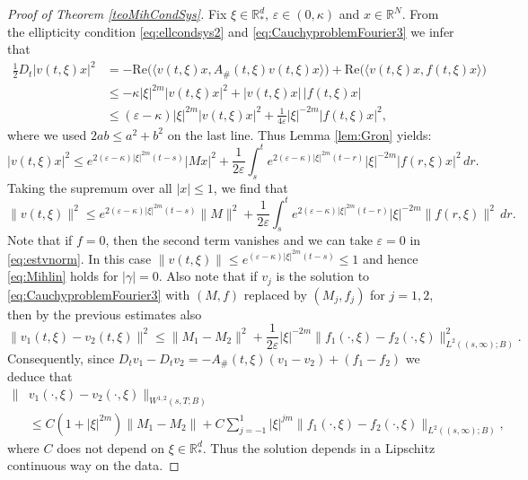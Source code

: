 \documentclass{amsart}
\theoremstyle{plain}
\theoremstyle{remark}
\theoremstyle{plain}
\numberwithin{equation}{section}
\begin{document}
\begin{proof}[Proof of Theorem \ref{teoMihCondSys}]
Fix $\xi\in { \mathbb{R} }^d_*$, $\varepsilon\in (0,\kappa)$ and $x\in { \mathbb{R} }^N$. From the ellipticity condition \eqref{eq:ellcondsys2} and \eqref{eq:CauchyproblemFourier3} we infer that
\begin{align*}
 \frac12D_t |v(t,\xi)x|^2 & = -\text{Re}\big({\langle} v(t,\xi)x,A_{\#}(t,\xi) v(t,\xi)x{\rangle}\big) + \text{Re} \big({\langle} v(t,\xi)x, f(t,\xi)x{\rangle}\big)
 \\ & \leq -\kappa|\xi|^{2m} |v(t,\xi)x|^2 + |v(t,\xi)x| \, |f(t,\xi)x|
 \\ & \leq (\varepsilon -\kappa)|\xi|^{2m} |v(t,\xi)x|^2 + \frac{1}{4\varepsilon} |\xi|^{-2m} |f(t,\xi)x|^2,
\end{align*}
where we used $2ab \leq a^2+b^2$ on the last line.
Thus Lemma \ref{lem:Gron} yields:
\begin{equation}
|v(t,\xi)x|^2 \leq e^{2(\varepsilon-\kappa) |\xi|^{2m} (t-s)}| Mx|^2 + \frac{1}{2\varepsilon} \int_s^t e^{2(\varepsilon-\kappa) |\xi|^{2m} (t-r)} |\xi|^{-2m} |f(r,\xi)x|^2 \, dr.
\nonumber
\end{equation}
Taking the supremum over all $|x|\leq 1$, we find that
\begin{equation}\label{eq:estvnorm}
\|v(t,\xi)\|^2 \leq  e^{2(\varepsilon-\kappa) |\xi|^{2m} (t-s)} \|M\|^2 + \frac{1}{2\varepsilon} \int_s^t e^{2(\varepsilon-\kappa) |\xi|^{2m} (t-r)} |\xi|^{-2m} \|f(r,\xi)\|^2 \, dr.
\end{equation}
Note that if $f=0$, then the second term vanishes and we can take $\varepsilon=0$ in \eqref{eq:estvnorm}.
In this case $\|v(t,\xi)\| \leq e^{(\varepsilon-\kappa) |\xi|^{2m} (t-s)} \leq 1$ and hence \eqref{eq:Mihlin} holds for $|\gamma|=0$. Also note that if $v_j$ is the solution to \eqref{eq:CauchyproblemFourier3} with $(M,f)$ replaced by $(M_j,f_j)$ for $j=1, 2$, then by the previous estimates also
\[\|v_1(t,\xi) - v_2(t,\xi)\|^2 \leq \|M_1 - M_2\|^2 + \frac{1}{2\varepsilon} |\xi|^{-2m} \|f_1(\cdot,\xi) - f_2(\cdot,\xi)\|^2_{L^2((s,\infty);B)}.\]
Consequently, since $D_t v_1 - D_t v_2 = -A_{\#}(t,\xi)(v_1-v_2) + (f_1-f_2)$
we deduce that
\begin{align*}
\|&v_1(\cdot,\xi) - v_2(\cdot, \xi)\|_{W^{1,2}(s,T;B)} \\ & \leq C(1+|\xi|^{2m}) \|M_1 - M_2\| + C\sum_{j=-1}^1 |\xi|^{jm}
\|f_1(\cdot,\xi) - f_2(\cdot,\xi)\|_{L^2((s,\infty);B)},
\end{align*}
where $C$ does not depend on $\xi\in { \mathbb{R} }^d_*$.
Thus the solution depends in a Lipschitz continuous way on the data.


\end{proof}
\end{document}
